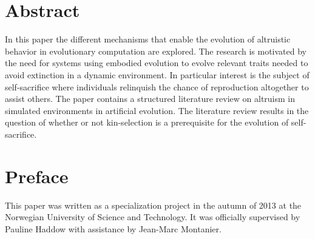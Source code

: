 \documentclass[a4paper]{book}
\begin{document}
\thispagestyle{empty}

\cleardoublepage

\frontmatter

\section*{Abstract}


In this paper the different mechanisms that enable the evolution of altruistic behavior in evolutionary computation are explored. 
The research is motivated by the need for systems using embodied evolution to evolve relevant traits needed to avoid extinction in a dynamic environment.
In particular interest is the subject of self-sacrifice where individuals relinquish the chance of reproduction altogether to assist others. 
The paper contains a structured literature review on altruism in simulated environments in artificial evolution. 
The literature review results in the question of whether or not kin-selection is a prerequisite for the evolution of self-sacrifice.  



\clearpage

\section*{Preface}



\vspace{1cm}

This paper was written as a specialization project in the autumn of 2013 at the Norwegian University of Science and Technology. It was officially supervised by Pauline Haddow with assistance by Jean-Marc Montanier.

\vfill
\end{document}
